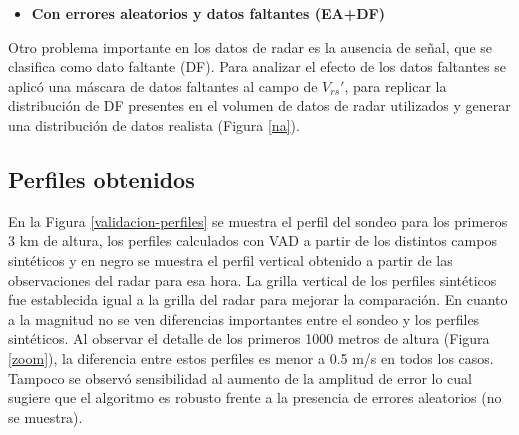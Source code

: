 \documentclass[12pt,spanish,oneside, a4paper]{book}
\providecommand{\tightlist}{%
  \setlength{\itemsep}{0pt}\setlength{\parskip}{0pt}}
\begin{document}
\begin{itemize}
\tightlist
\item
  \textbf{Con errores aleatorios y datos faltantes (EA+DF)}
\end{itemize}

Otro problema importante en los datos de radar es la ausencia de señal,
que se clasifica como dato faltante (DF). Para analizar el efecto de los
datos faltantes se aplicó una máscara de datos faltantes al campo de
\(V_{rs}'\), para replicar la distribución de DF presentes en el volumen
de datos de radar utilizados y generar una distribución de datos
realista (Figura \ref{na}).

\subsection{Perfiles obtenidos}\label{perfiles-obtenidos}

En la Figura \ref{validacion-perfiles} se muestra el perfil del sondeo
para los primeros 3 km de altura, los perfiles calculados con VAD a
partir de los distintos campos sintéticos y en negro se muestra el
perfil vertical obtenido a partir de las observaciones del radar para
esa hora. La grilla vertical de los perfiles sintéticos fue establecida
igual a la grilla del radar para mejorar la comparación. En cuanto a la
magnitud no se ven diferencias importantes entre el sondeo y los
perfiles sintéticos. Al observar el detalle de los primeros 1000 metros
de altura (Figura \ref{zoom}), la diferencia entre estos perfiles es
menor a 0.5 m/s en todos los casos. Tampoco se observó sensibilidad al
aumento de la amplitud de error lo cual sugiere que el algoritmo es
robusto frente a la presencia de errores aleatorios (no se muestra).
\end{document}
